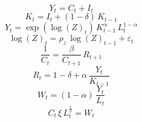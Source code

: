 \begin{dmath}
{Y}_{t}={C}_{t}+{I}_{t}
\end{dmath}
\begin{dmath}
{K}_{t}={I}_{t}+\left(1-{\delta}\right)\, {K}_{t-1}
\end{dmath}
\begin{dmath}
{Y}_{t}=\exp\left({\log(Z)}_{t}\right)\, {K}_{t-1}^{{\alpha}}\, {L}_{t}^{1-{\alpha}}
\end{dmath}
\begin{dmath}
{\log(Z)}_{t}={\rho_z}\, {\log(Z)}_{t-1}+{\varepsilon}_{t}
\end{dmath}
\begin{dmath}
\frac{1}{{C}_{t}}=\frac{{\beta}}{{C}_{t+1}}\, {R}_{t+1}
\end{dmath}
\begin{dmath}
{R}_{t}=1-{\delta}+{\alpha}\, \frac{{Y}_{t}}{{K}_{t-1}}
\end{dmath}
\begin{dmath}
{W}_{t}=\left(1-{\alpha}\right)\, \frac{{Y}_{t}}{{L}_{t}}
\end{dmath}
\begin{dmath}
{C}_{t}\, {\xi}\, {L}_{t}^{\frac{1}{{\nu}}}={W}_{t}
\end{dmath}
